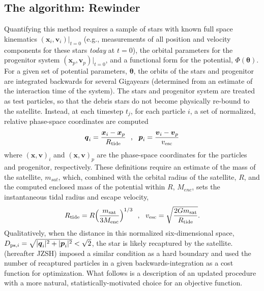 \documentclass[preprint]{aastex}
\newcommand{\bs}{\boldsymbol}
\begin{document}
\subsection{The algorithm: Rewinder}
Quantifying this method requires a sample of stars with known full
space kinematics $(\bs{x}_{i}, \bs{v}_{i})|_{t=0}$ (e.g., measurements
of all position and velocity components for these stars \emph{today}
at $t=0$), the orbital parameters for the progenitor system
$(\bs{x}_p, \bs{v}_p)|_{t=0}$, and a functional form for the
potential, $\Phi({\boldsymbol\theta})$. For a given set of potential
parameters, $\boldsymbol\theta$, the orbits of the stars and
progenitor are integrated backwards for several Gigayears (determined
from an estimate of the interaction time of the system). The stars and
progenitor system are treated as test particles, so that the debris
stars do not become physically re-bound to the satellite. Instead, at
each timestep $t_j$, for each particle $i$, a set of normalized,
relative phase-space coordinates are computed
\begin{equation}
  \bs{q}_{i} = \frac{\bs{x}_{i} -
    \bs{x}_{p}}{R_{\rm tide}}\,\,\,\,,\,\,\,\,\bs{p}_{i} = \frac{\bs{v}_{i} -
    \bs{v}_{p}}{v_{\rm esc}}
\end{equation}
where $(\bs{x},\bs{v})_{i}$ and $(\bs{x},\bs{v})_{p}$ are the
phase-space coordinates for the particles and progenitor,
respectively. These definitions require an estimate of the mass of the
satellite, $m_{sat}$, which, combined with the orbital radius of the
satellite, $R$, and the computed enclosed mass of the potential within
$R$, $M_{enc}$, sets the instantaneous tidal radius and escape
velocity,
\begin{equation}
  R_{\rm tide}=R\Big(\frac{m_{\rm sat}}{3M_{\rm enc}}\Big)^{1/3}\,\,\,\,,\,\,\,\,
  v_{\rm esc}=\sqrt{\frac{2Gm_{\rm sat}}{R_{\rm tide}}}.
\end{equation}
Qualitatively, when the distance in this normalized six-dimensional
space, $D_{{\rm ps},i}=\sqrt{|\bs{q}_{i}|^2+|\bs{p}_{i}|^2} <
\sqrt{2}$, the star is likely recaptured by the
satellite. \citet{johnston99a} (hereafter JZSH) imposed a similar
condition as a hard boundary and used the number of recaptured
particles in a given backwards-integration as a cost function for
optimization. What follows is a description of an updated procedure
with a more natural, statistically-motivated choice for an objective
function.

\end{document}
